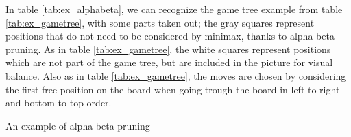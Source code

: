 In table \ref{tab:ex_alphabeta}, we can recognize the game tree example from table \ref{tab:ex_gametree}, with some parts taken out; the gray squares represent positions that do not need to be considered by minimax, thanks to alpha-beta pruning.
As in table \ref{tab:ex_gametree}, the white squares represent positions which are not part of the game tree, but are included in the picture for visual balance.
Also as in table \ref{tab:ex_gametree}, the moves are chosen by considering the first free position on the board when going trough the board in left to right and bottom to top order.

\begin{center}
\def\arraystretch{5.5}
\begin{table}
\def\svgwidth{\columnwidth} 
\caption{An example of alpha-beta pruning}
\label{tab:ex_alphabeta}
\end{table}
\end{center}

